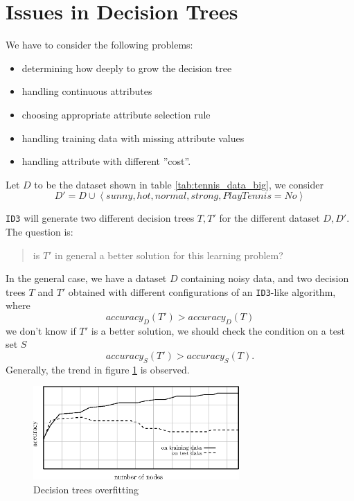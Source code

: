 \documentclass[10pt, letterpaper]{report}
\begin{document}
\newpage
\section{Issues in Decision Trees}
We have to consider the following problems:\begin{itemize}
	\item determining how deeply to grow the decision tree
	\item handling continuous attributes
	\item choosing appropriate attribute selection rule
	\item handling training data with missing attribute values
	\item handling attribute with different ''cost''.
\end{itemize}

\bigskip
\noindent Let $D$ to be the dataset shown in table \ref{tab:tennis_data_big}, we consider \begin{equation}
	D'=D\cup \left\langle  sunny,hot,normal,strong, PlayTennis=No\right\rangle
\end{equation}

\noindent\texttt{ID3} will generate two different decision trees $T,T'$ for the different dataset $D,D'$. The question is:\begin{quote}
	is $T'$ in general a better solution for this learning problem?
\end{quote}

In the general case, we have a dataset $D$ containing noisy data, and two decision trees $T$ and $T'$ obtained with different configurations of an \texttt{ID3}-like algorithm, where\begin{equation}
	accuracy_D(T')>accuracy_D(T)
\end{equation}
we don't know if $T'$ is a better solution, we should check the condition on a test set $S$\begin{equation}
	accuracy_S(T')>accuracy_S(T).
\end{equation}
Generally, the trend in figure \ref{img:trees_overfitting} is observed.\bigskip

\begin{figure}[h!]
	\centering
	\includegraphics[width=0.7\textwidth]{images/trees_overfitting.eps}
	\caption{Decision trees overfitting}
	\label{img:trees_overfitting}
\end{figure}
\end{document}
